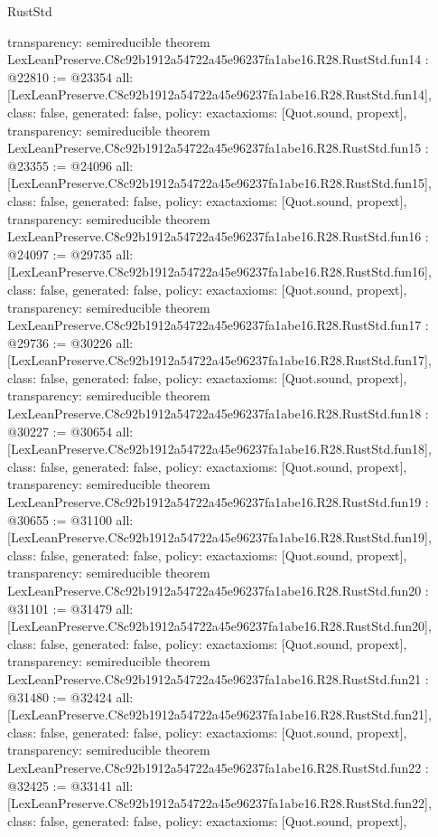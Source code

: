 \begin{lexlean}{RustStd}
\begin{coremodule}
{  transparency: semireducible
}
theorem LexLeanPreserve.C8c92b1912a54722a45e96237fa1abe16.R28.RustStd.fun14 : @22810 := @23354 {
  all: [LexLeanPreserve.C8c92b1912a54722a45e96237fa1abe16.R28.RustStd.fun14],
  class: false,
  generated: false,
  policy: exact{axioms: [Quot.sound, propext]},
  transparency: semireducible
}
theorem LexLeanPreserve.C8c92b1912a54722a45e96237fa1abe16.R28.RustStd.fun15 : @23355 := @24096 {
  all: [LexLeanPreserve.C8c92b1912a54722a45e96237fa1abe16.R28.RustStd.fun15],
  class: false,
  generated: false,
  policy: exact{axioms: [Quot.sound, propext]},
  transparency: semireducible
}
theorem LexLeanPreserve.C8c92b1912a54722a45e96237fa1abe16.R28.RustStd.fun16 : @24097 := @29735 {
  all: [LexLeanPreserve.C8c92b1912a54722a45e96237fa1abe16.R28.RustStd.fun16],
  class: false,
  generated: false,
  policy: exact{axioms: [Quot.sound, propext]},
  transparency: semireducible
}
theorem LexLeanPreserve.C8c92b1912a54722a45e96237fa1abe16.R28.RustStd.fun17 : @29736 := @30226 {
  all: [LexLeanPreserve.C8c92b1912a54722a45e96237fa1abe16.R28.RustStd.fun17],
  class: false,
  generated: false,
  policy: exact{axioms: [Quot.sound, propext]},
  transparency: semireducible
}
theorem LexLeanPreserve.C8c92b1912a54722a45e96237fa1abe16.R28.RustStd.fun18 : @30227 := @30654 {
  all: [LexLeanPreserve.C8c92b1912a54722a45e96237fa1abe16.R28.RustStd.fun18],
  class: false,
  generated: false,
  policy: exact{axioms: [Quot.sound, propext]},
  transparency: semireducible
}
theorem LexLeanPreserve.C8c92b1912a54722a45e96237fa1abe16.R28.RustStd.fun19 : @30655 := @31100 {
  all: [LexLeanPreserve.C8c92b1912a54722a45e96237fa1abe16.R28.RustStd.fun19],
  class: false,
  generated: false,
  policy: exact{axioms: [Quot.sound, propext]},
  transparency: semireducible
}
theorem LexLeanPreserve.C8c92b1912a54722a45e96237fa1abe16.R28.RustStd.fun20 : @31101 := @31479 {
  all: [LexLeanPreserve.C8c92b1912a54722a45e96237fa1abe16.R28.RustStd.fun20],
  class: false,
  generated: false,
  policy: exact{axioms: [Quot.sound, propext]},
  transparency: semireducible
}
theorem LexLeanPreserve.C8c92b1912a54722a45e96237fa1abe16.R28.RustStd.fun21 : @31480 := @32424 {
  all: [LexLeanPreserve.C8c92b1912a54722a45e96237fa1abe16.R28.RustStd.fun21],
  class: false,
  generated: false,
  policy: exact{axioms: [Quot.sound, propext]},
  transparency: semireducible
}
theorem LexLeanPreserve.C8c92b1912a54722a45e96237fa1abe16.R28.RustStd.fun22 : @32425 := @33141 {
  all: [LexLeanPreserve.C8c92b1912a54722a45e96237fa1abe16.R28.RustStd.fun22],
  class: false,
  generated: false,
  policy: exact{axioms: [Quot.sound, propext]},
}
\end{coremodule}
\end{lexlean}
